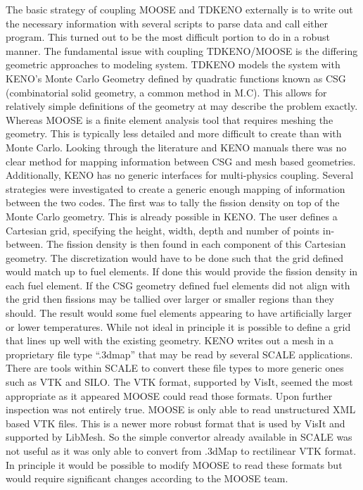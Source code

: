 \documentclass[11pt]{article}
\begin{document}
The basic strategy of coupling MOOSE and TDKENO externally is to write out the necessary information with several scripts to parse data and call either program. This turned out to be the most difficult portion to do in a robust manner.  
The fundamental issue with coupling TDKENO/MOOSE is the differing geometric approaches to modeling system.  TDKENO models the system with KENO’s Monte Carlo Geometry defined by quadratic functions known as CSG (combinatorial solid geometry, a common method in M.C).  This allows for relatively simple definitions of the geometry at may describe the problem exactly.  Whereas MOOSE is a finite element analysis tool that requires meshing the geometry.  This is typically less detailed and more difficult to create than with Monte Carlo.  Looking through the literature and KENO manuals there was no clear method for mapping information between CSG and mesh based geometries.  Additionally, KENO has no generic interfaces for multi-physics coupling.  Several strategies were investigated to create a generic enough mapping of information between the two codes. 
The first was to tally the fission density on top of the Monte Carlo geometry.  This is already possible in KENO.  The user defines a Cartesian grid, specifying the height, width, depth and number of points in-between.   The fission density is then found in each component of this Cartesian geometry.  The discretization would have to be done such that the grid defined would match up to fuel elements.  If done this would provide the fission density in each fuel element.  If the CSG geometry defined fuel elements did not align with the grid then fissions may be tallied over larger or smaller regions than they should.  The result would some fuel elements appearing to have artificially larger or lower temperatures.  While not ideal in principle it is possible to define a grid that lines up well with the existing geometry.  
KENO writes out a mesh in a proprietary file type “.3dmap” that may be read by several SCALE applications.  There are tools within SCALE to convert these file types to more generic ones such as VTK and SILO.  The VTK format, supported by VisIt, seemed the most appropriate as it appeared MOOSE could read those formats.  Upon further inspection was not entirely true. MOOSE is only able to read unstructured XML based VTK files.  This is a newer more robust format that is used by VisIt and supported by LibMesh.  So the simple convertor already available in SCALE was not useful as it was only able to convert from .3dMap to rectilinear VTK format.  In principle it would be possible to modify MOOSE to read these formats but would require significant changes according to the MOOSE team.  
\end{document}
